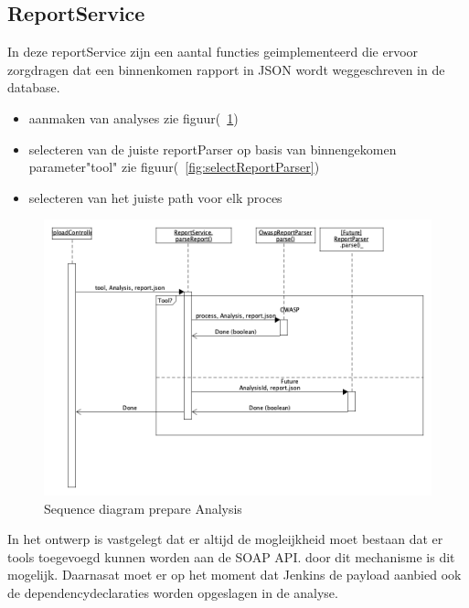 \subsection{ReportService}\label{subsec:reportservice}


In deze reportService zijn een aantal functies geimplementeerd die ervoor zorgdragen dat een binnenkomen rapport in JSON wordt weggeschreven in de database.
\begin{itemize}
    \item aanmaken van analyses zie figuur(~\ref{fig:analysisPrepare})
    \item selecteren van de juiste reportParser op basis van binnengekomen parameter"tool" zie figuur(~\ref{fig:selectReportParser})
    \item selecteren van het juiste path voor elk proces
\end{itemize}



\begin{figure}[bth]
    \myfloatalign
    \includegraphics[width=14cm]{gfx/umlet/exports/SeqProcessPayload}
    \caption{Sequence diagram prepare Analysis}
    \label{fig:analysisPrepare}
\end{figure}

In het ontwerp is vastgelegt dat er altijd de mogleijkheid moet bestaan dat er tools toegevoegd kunnen worden aan de SOAP API. door dit mechanisme is dit mogelijk. Daarnasat moet er op het moment dat Jenkins de payload aanbied ook de dependencydeclaraties worden opgeslagen in de analyse.

